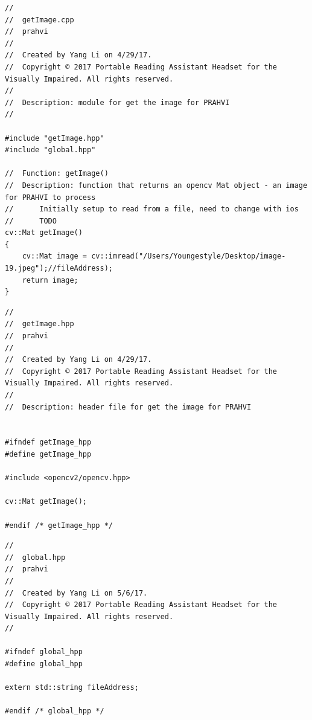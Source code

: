 \begin{lstlisting}
//
//  getImage.cpp
//  prahvi
//
//  Created by Yang Li on 4/29/17.
//  Copyright © 2017 Portable Reading Assistant Headset for the Visually Impaired. All rights reserved.
//
//  Description: module for get the image for PRAHVI
//

#include "getImage.hpp"
#include "global.hpp"

//  Function: getImage()
//  Description: function that returns an opencv Mat object - an image for PRAHVI to process
//		Initially setup to read from a file, need to change with ios
//		TODO
cv::Mat getImage()
{
	cv::Mat image = cv::imread("/Users/Youngestyle/Desktop/image-19.jpeg");//fileAddress);
	return image;
}

\end{lstlisting}

\begin{lstlisting}
//
//  getImage.hpp
//  prahvi
//
//  Created by Yang Li on 4/29/17.
//  Copyright © 2017 Portable Reading Assistant Headset for the Visually Impaired. All rights reserved.
//
//  Description: header file for get the image for PRAHVI


#ifndef getImage_hpp
#define getImage_hpp

#include <opencv2/opencv.hpp>

cv::Mat getImage();

#endif /* getImage_hpp */

\end{lstlisting}

\begin{lstlisting}
//
//  global.hpp
//  prahvi
//
//  Created by Yang Li on 5/6/17.
//  Copyright © 2017 Portable Reading Assistant Headset for the Visually Impaired. All rights reserved.
//

#ifndef global_hpp
#define global_hpp

extern std::string fileAddress;

#endif /* global_hpp */

\end{lstlisting}

